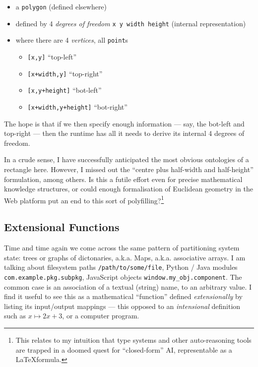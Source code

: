 \begin{itemize}
\tightlist
\item
  a \texttt{polygon} (defined elsewhere)
\item
  defined by 4 \emph{degrees of freedom} \texttt{x\ y\ width\ height}
  (internal representation)
\item
  where there are 4 \emph{vertices}, all \texttt{point}s

  \begin{itemize}
  \tightlist
  \item
    \texttt{{[}x,y{]}} ``top-left''
  \item
    \texttt{{[}x+width,y{]}} ``top-right''
  \item
    \texttt{{[}x,y+height{]}} ``bot-left''
  \item
    \texttt{{[}x+width,y+height{]}} ``bot-right''
  \end{itemize}
\end{itemize}

The hope is that if we then specify enough information --- say, the
bot-left and top-right --- then the runtime has all it needs to derive
its internal 4 degrees of freedom.

In a crude sense, I have successfully anticipated the most obvious
ontologies of a rectangle here. However, I missed out the ``centre plus
half-width and half-height'' formulation, among others. Is this a futile
effort even for precise mathematical knowledge structures, or could
enough formalisation of Euclidean geometry in the Web platform put an
end to this sort of polyfilling?\footnote{This relates to my intuition
  that type systems and other auto-reasoning tools are trapped in a
  doomed quest for ``closed-form'' AI, representable as a
  \LaTeX formula.}

\hypertarget{extensional-functions}{%
\subsection{Extensional Functions}\label{extensional-functions}}

Time and time again we come across the same pattern of partitioning
system state: trees or graphs of dictonaries, a.k.a. Maps, a.k.a.
associative arrays. I am talking about filesystem paths
\texttt{/path/to/some/file}, Python / Java modules
\texttt{com.example.pkg.subpkg}, JavaScript objects
\texttt{window.my\_obj.component}. The common case is an association of
a textual (string) name, to an arbitrary value. I find it useful to see
this as a mathematical ``function'' defined \emph{extensionally} by
listing its input/output mappings --- this opposed to an
\emph{intensional} definition such as \(x \mapsto 2x+3\), or a computer
program.

